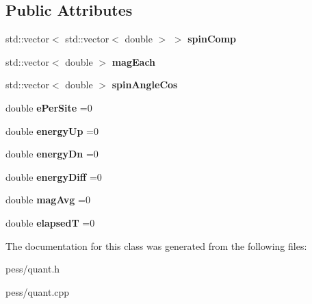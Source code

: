 \subsection*{Public Attributes}
\begin{DoxyCompactItemize}
\item 
std\+::vector$<$ std\+::vector$<$ double $>$ $>$ {\bfseries spin\+Comp}\hypertarget{classquantities_a909ebc6e87f3bde635a1db08200adf93}{}\label{classquantities_a909ebc6e87f3bde635a1db08200adf93}

\item 
std\+::vector$<$ double $>$ {\bfseries mag\+Each}\hypertarget{classquantities_ae261c24d2dd0bb7f321f094a2d166abb}{}\label{classquantities_ae261c24d2dd0bb7f321f094a2d166abb}

\item 
std\+::vector$<$ double $>$ {\bfseries spin\+Angle\+Cos}\hypertarget{classquantities_a1890f1228cba10a563f3c773a63d02d3}{}\label{classquantities_a1890f1228cba10a563f3c773a63d02d3}

\item 
double {\bfseries e\+Per\+Site} =0\hypertarget{classquantities_a530f884c7fda940cb59a147771450e03}{}\label{classquantities_a530f884c7fda940cb59a147771450e03}

\item 
double {\bfseries energy\+Up} =0\hypertarget{classquantities_a37ddd861807b8ca9fea76bb659ec4a83}{}\label{classquantities_a37ddd861807b8ca9fea76bb659ec4a83}

\item 
double {\bfseries energy\+Dn} =0\hypertarget{classquantities_adee2ba8e0dd90543a3488fe00b572608}{}\label{classquantities_adee2ba8e0dd90543a3488fe00b572608}

\item 
double {\bfseries energy\+Diff} =0\hypertarget{classquantities_af7bf22357e9846bdeb0ce10b39f0ac38}{}\label{classquantities_af7bf22357e9846bdeb0ce10b39f0ac38}

\item 
double {\bfseries mag\+Avg} =0\hypertarget{classquantities_a6007928d9607dafe1a69e4c42638983f}{}\label{classquantities_a6007928d9607dafe1a69e4c42638983f}

\item 
double {\bfseries elapsedT} =0\hypertarget{classquantities_afe4da681543149de0dabdfe0d03ef414}{}\label{classquantities_afe4da681543149de0dabdfe0d03ef414}

\end{DoxyCompactItemize}


The documentation for this class was generated from the following files\+:\begin{DoxyCompactItemize}
\item 
pess/quant.\+h\item 
pess/quant.\+cpp\end{DoxyCompactItemize}
